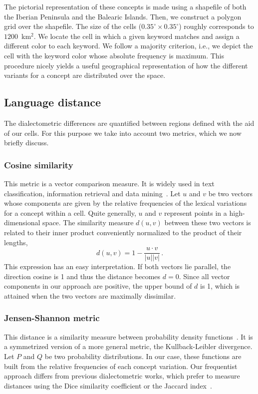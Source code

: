 \documentclass[11pt]{article}
\begin{document}
The pictorial representation of these concepts is made using a shapefile of both the Iberian Peninsula and the Balearic Islands. Then, we construct a polygon grid over the shapefile. The size of the cells ($0.35^\circ \times 0.35^\circ$) roughly corresponds to $1200$~km$^2$. We locate the cell in which a given keyword matches and assign a different color to each keyword. We follow a majority criterion, i.e., we depict the cell with the keyword color whose absolute frequency is maximum. This procedure nicely yields a useful geographical representation of how the different variants for a concept are distributed over the space. 

\subsection{Language distance}

The dialectometric differences are quantified between regions defined with the aid of our cells.
For this purpose we take into account two metrics, which we now briefly discuss.

\subsubsection{Cosine similarity}
This metric is a vector comparison measure. It is widely used in text classification, information retrieval and data mining~\cite{murphy}.
Let $u$ and $v$ be two vectors whose components are given by the relative frequencies of the lexical variations for a concept
within a cell. Quite generally, $u$ and $v$ represent points in a high-dimensional space. The similarity measure $d(u,v)$
between these two vectors is related to their inner product conveniently normalized to the product of their lengths,
\begin{equation}\label{cosine}
d(u,v)=1-\frac{u\cdot v}{|u||v|}\,.
\end{equation}
This expression has an easy interpretation. If both vectors lie parallel,
the direction cosine is 1 and thus the distance becomes $d=0$.
Since all vector components in our approach are positive, the upper bound of $d$ is 1,
which is attained when the two vectors are maximally dissimilar. 

\subsubsection{Jensen-Shannon metric}
This distance is a similarity measure between probability density functions~\cite{lin91}.
It is a symmetrized version of a more general metric, the Kullback-Leibler divergence. Let  $P$ and $Q$ be two probability distributions. In our case, these functions are built from
the relative frequencies of each concept variation. Our frequentist approach differs from
previous dialectometric works, which prefer to measure distances using
the Dice similarity coefficient or the Jaccard index~\cite{manning}.
\end{document}
